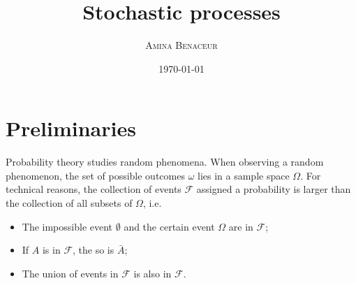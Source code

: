 \documentclass[12pt,a4paper]{article}
\title{ \bfseries \Huge {Stochastic processes}}
\author{  \scshape  Amina Benaceur }
\date{\today}
\newcommand{\calF}{\mathcal F}
\begin{document}
  \maketitle
  \section{Preliminaries}
  Probability theory studies random phenomena. 
  When observing a random phenomenon, the set of possible outcomes $\omega$ lies in a sample space $\Omega$. 
  For technical reasons, the collection of events $\calF$ assigned a probability is larger than the collection of all subsets of $\Omega$, i.e.
  \begin{itemize}
  	\item The impossible event $\emptyset$ and the certain event $\Omega$ are in $\calF$;
  	\item If $A$ is in $\calF$, the so is $\bar A$;
  	\item The union of events in $\calF$ is also in $\calF$.
  \end{itemize} 
  
  
\end{document}
